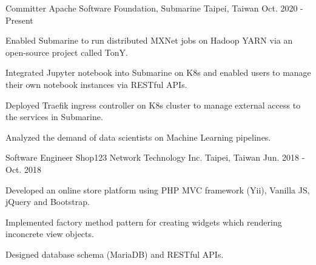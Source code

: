 \begin{cventries}
  \cventry
    {Committer} %
    {Apache Software Foundation, Submarine} %
    {Taipei, Taiwan} %
    {Oct. 2020 - Present} %
    {
      \begin{cvitems} %
        \item {Enabled Submarine to run distributed MXNet jobs on Hadoop YARN via an open-source project called TonY.}
        \item {Integrated Jupyter notebook into Submarine on K8s and enabled users to manage their own notebook instances via RESTful APIs.}
        \item {Deployed Traefik ingress controller on K8s cluster to manage external access to the services in Submarine.}
        \item {Analyzed the demand of data scientists on Machine Learning pipelines.}
      \end{cvitems}
    }

  \cventry
    {Software Engineer} %
    {Shop123 Network Technology Inc.} %
    {Taipei, Taiwan} %
    {Jun. 2018 - Oct. 2018} %
    {
      \begin{cvitems} %
        \item {Developed an online store platform using PHP MVC framework (Yii), Vanilla JS, jQuery and Bootstrap.}
        \item {Implemented factory method pattern for creating widgets which rendering inconcrete view objects.}
        \item {Designed database schema (MariaDB) and RESTful APIs.}
      \end{cvitems}
    }


\end{cventries}
